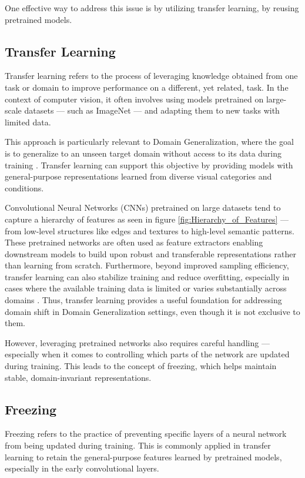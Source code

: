 One effective way to address this issue is by utilizing transfer learning, by reusing pretrained models.
\subsection{Transfer Learning}
Transfer learning refers to the process of leveraging knowledge obtained from one task or domain to improve performance on a different, yet related, task. In the context of computer vision, it often involves using models pretrained on large-scale datasets — such as ImageNet — and adapting them to new tasks with limited data.

This approach is particularly relevant to Domain Generalization, where the goal is to generalize to an unseen target domain without access to its data during training \citep{gulrajaniSearchLostDomain2020,liDeeperBroaderArtier2017}. Transfer learning can support this objective by providing models with general-purpose representations learned from diverse visual categories and conditions.

Convolutional Neural Networks (CNNs) pretrained on large datasets tend to capture a hierarchy of features as seen in figure \ref{fig:Hierarchy_of_Features} — from low-level structures like edges and textures to high-level semantic patterns. These pretrained networks are often used as feature extractors enabling downstream models to build upon robust and transferable representations rather than learning from scratch.
Furthermore, beyond improved sampling efficiency, transfer learning can also stabilize training and reduce overfitting, especially in cases where the available training data is limited or varies substantially across domains \citep{thomasWhatsLatentLeveraging2025}. Thus, transfer learning provides a useful foundation for addressing domain shift in Domain Generalization settings, even though it is not exclusive to them.

However, leveraging pretrained networks also requires careful handling — especially when it comes to controlling which parts of the network are updated during training. This leads to the concept of freezing, which helps maintain stable, domain-invariant representations.

\subsection{Freezing}
Freezing refers to the practice of preventing specific layers of a neural network from being updated during training. This is commonly applied in transfer learning to retain the general-purpose features learned by pretrained models, especially in the early convolutional layers.

